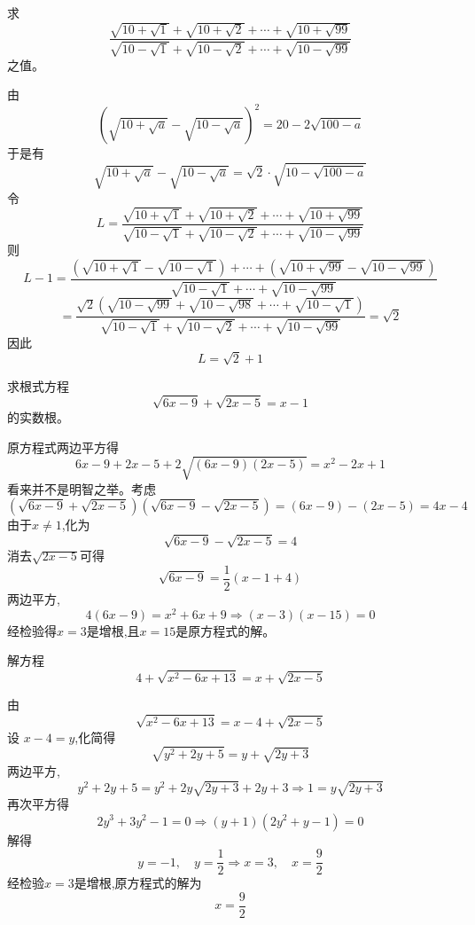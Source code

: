 \begin{questions}
    \question 求
    \[
    \frac{\sqrt{10+\sqrt{1}} + \sqrt{10+\sqrt{2}} + \cdots + \sqrt{10+\sqrt{99}}}{\sqrt{10-\sqrt{1}} + \sqrt{10-\sqrt{2}} + \cdots + \sqrt{10-\sqrt{99}}}
    \]
    之值。
    \begin{solution}
        由
        \[
        \left(\sqrt{10+\sqrt{a}} - \sqrt{10-\sqrt{a}}\right)^2 = 20 - 2\sqrt{100 - a}
        \]
        于是有
        \[
        \sqrt{10+\sqrt{a}} - \sqrt{10-\sqrt{a}} = \sqrt{2} \cdot \sqrt{10 - \sqrt{100 - a}}
        \]
        令
        \[
        L = \frac{\sqrt{10+\sqrt{1}} + \sqrt{10+\sqrt{2}} + \cdots + \sqrt{10+\sqrt{99}}}{\sqrt{10-\sqrt{1}} + \sqrt{10-\sqrt{2}} + \cdots + \sqrt{10-\sqrt{99}}}
        \]
        则
        \[
        L - 1 = \frac{
        (\sqrt{10+\sqrt{1}} - \sqrt{10-\sqrt{1}}) + \cdots + (\sqrt{10+\sqrt{99}} - \sqrt{10-\sqrt{99}})
        }{
        \sqrt{10-\sqrt{1}} + \cdots + \sqrt{10-\sqrt{99}}
        }
        \]
        \[
        = \frac{
        \sqrt{2} \left(\sqrt{10 - \sqrt{99}} + \sqrt{10 - \sqrt{98}} + \cdots + \sqrt{10 - \sqrt{1}}\right)
        }{
        \sqrt{10 - \sqrt{1}} + \sqrt{10 - \sqrt{2}} + \cdots + \sqrt{10 - \sqrt{99}}
        } = \sqrt{2}
        \]
        因此
        \[
        L = \sqrt{2} + 1
        \]
    \end{solution}
    
    \question 求根式方程
    \[
    \sqrt{6x-9} + \sqrt{2x-5} = x-1
    \]
    的实数根。
    \begin{solution}
        原方程式两边平方得
        \[
        6x-9+2x-5+2\sqrt{(6x-9)(2x-5)}=x^2-2x+1
        \]
        看来并不是明智之举。考虑
        \[
        (\sqrt{6x-9} + \sqrt{2x-5})(\sqrt{6x-9} - \sqrt{2x-5}) = (6x-9) - (2x-5) = 4x-4
        \]
        由于$x \neq 1$,化为
        \[
        \sqrt{6x-9} - \sqrt{2x-5} = 4
        \]
        消去$\sqrt{2x-5}$可得
        \[
        \sqrt{6x-9}=\frac{1}{2}(x-1+4)
        \]
        两边平方,
        \[
        4(6x-9)=x^2+6x+9 \Rightarrow (x-3)(x-15) = 0
        \]
        经检验得$x=3$是增根,且$x=15$是原方程式的解。
    \end{solution}

    \question 解方程
    \[
    4+\sqrt{x^2-6x+13} = x+\sqrt{2x-5}
    \]
    \begin{solution}
        由
        \[
        \sqrt{x^2-6x+13} = x-4 + \sqrt{2x-5}
        \]
        设 $x-4 = y$,化简得
        \[
        \sqrt{y^2 + 2y + 5} = y + \sqrt{2y+3}
        \]
        两边平方,
        \[
        y^2 + 2y + 5 = y^2 + 2y\sqrt{2y+3} + 2y + 3 \Rightarrow
        1 = y\sqrt{2y+3}
        \]
        再次平方得
        \[
        2y^3 + 3y^2 - 1 = 0 \Rightarrow (y+1)(2y^2+y-1) = 0
        \]
        解得
        \[
        y = -1, \quad y = \frac{1}{2} \Rightarrow x = 3, \quad x = \frac{9}{2}
        \]
        经检验$x=3$是增根,原方程式的解为
        \[
        x=\frac{9}{2}
        \]
    \end{solution}


\end{questions}
